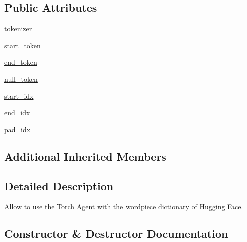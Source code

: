 \subsection*{Public Attributes}
\begin{DoxyCompactItemize}
\item 
\hyperlink{classparlai_1_1agents_1_1bert__ranker_1_1bert__dictionary_1_1BertDictionaryAgent_a255b3fa65375a03d2e74e0c2b2cc0fad}{tokenizer}
\item 
\hyperlink{classparlai_1_1agents_1_1bert__ranker_1_1bert__dictionary_1_1BertDictionaryAgent_a5b59ef24fb4aba9be417dd1c5ebd63af}{start\+\_\+token}
\item 
\hyperlink{classparlai_1_1agents_1_1bert__ranker_1_1bert__dictionary_1_1BertDictionaryAgent_a73ca2778d48882faa1bba25e33841d9c}{end\+\_\+token}
\item 
\hyperlink{classparlai_1_1agents_1_1bert__ranker_1_1bert__dictionary_1_1BertDictionaryAgent_a19f8c6b3d3954b4db246df54a4f8cb90}{null\+\_\+token}
\item 
\hyperlink{classparlai_1_1agents_1_1bert__ranker_1_1bert__dictionary_1_1BertDictionaryAgent_abbfc373c86a5d10c89b022c7082a051b}{start\+\_\+idx}
\item 
\hyperlink{classparlai_1_1agents_1_1bert__ranker_1_1bert__dictionary_1_1BertDictionaryAgent_a108b974b0f3048fc15aafd83cd0774f6}{end\+\_\+idx}
\item 
\hyperlink{classparlai_1_1agents_1_1bert__ranker_1_1bert__dictionary_1_1BertDictionaryAgent_a27aa43e578c745c4f7a340973a9e9eff}{pad\+\_\+idx}
\end{DoxyCompactItemize}
\subsection*{Additional Inherited Members}


\subsection{Detailed Description}
\begin{DoxyVerb}Allow to use the Torch Agent with the wordpiece dictionary of Hugging Face.
\end{DoxyVerb}
 

\subsection{Constructor \& Destructor Documentation}
\mbox{\label{classparlai_1_1agents_1_1bert__ranker_1_1bert__dictionary_1_1BertDictionaryAgent_aedf3441c187fc809926e490a9cab9875}} 

